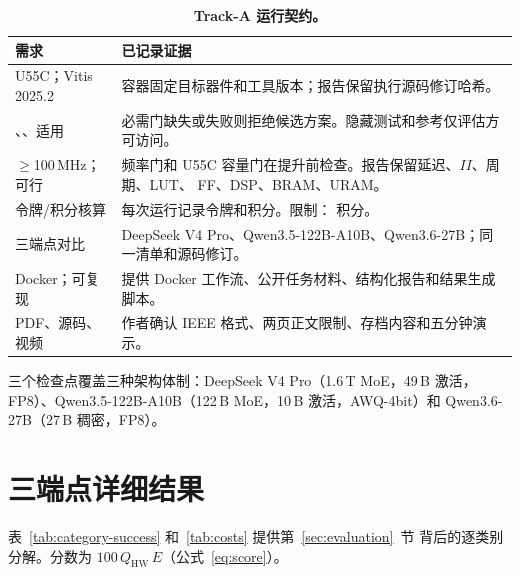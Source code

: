\begin{table}[H]
  \caption{\textbf{Track-A 运行契约。}}
  \label{tab:compliance}
  \centering
  \small
  \begin{tabular}{p{}p{}}
    \toprule
    需求 & 已记录证据 \\
    \midrule
    U55C；Vitis 2025.2 &
    容器固定目标器件和工具版本；报告保留执行源码修订哈希。 \\
    \CSim{}、\Synth{}、适用 \CoSim{} &
    必需门缺失或失败则拒绝候选方案。隐藏测试和参考仅评估方可访问。 \\
    $\geq$100\,MHz；可行 &
    频率门和 U55C 容量门在提升前检查。报告保留延迟、$II$、周期、LUT、
    FF、DSP、BRAM、URAM。 \\
    令牌/积分核算 &
    每次运行记录令牌和积分。限制：\CampaignCreditLimit{} 积分。 \\
    三端点对比 &
    DeepSeek V4 Pro、Qwen3.5-122B-A10B、Qwen3.6-27B；同一清单和源码修订。 \\
    Docker；可复现 &
    提供 Docker 工作流、公开任务材料、结构化报告和结果生成脚本。 \\
    PDF、源码、视频 &
    作者确认 IEEE 格式、两页正文限制、存档内容和五分钟演示。 \\
    \bottomrule
  \end{tabular}
\end{table}

三个检查点覆盖三种架构体制：DeepSeek V4 Pro（1.6\,T MoE，49\,B 激活，
FP8）、Qwen3.5-122B-A10B（122\,B MoE，10\,B 激活，AWQ-4bit）和
Qwen3.6-27B（27\,B 稠密，FP8）。

\section{三端点详细结果}
\label{app:results}

表~\ref{tab:category-success} 和~\ref{tab:costs} 提供第~\ref{sec:evaluation}~节
背后的逐类别分解。分数为 $100\,Q_{\mathrm{HW}}\,E$（公式~\eqref{eq:score}）。


